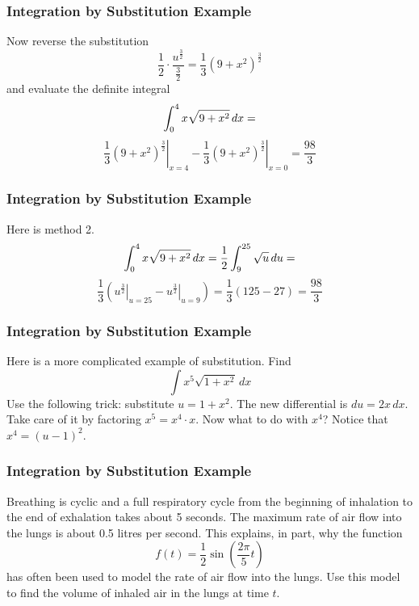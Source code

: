 \documentclass[xcolor=dvipsnames]{beamer}
\begin{document}
\begin{frame}
  \frametitle{Integration by Substitution Example}
Now reverse the substitution
\begin{equation}
  \label{eq:shaixeen}
\frac{1}{2}\cdot\frac{u^{\frac{3}{2}}}{\frac{3}{2}}=\frac{1}{3}(9+x^{2})^{\frac{3}{2}}
\end{equation}
and evaluate the definite integral
\begin{equation}
  \label{eq:eileevar}
\int_{0}^{4}x\sqrt{9+x^{2}}\,dx=\notag
\end{equation}
\begin{equation}
  \label{eq:lumuewah}
\left.\frac{1}{3}(9+x^{2})^{\frac{3}{2}}\right\vert_{x=4}-\left.\frac{1}{3}(9+x^{2})^{\frac{3}{2}}\right\vert_{x=0}=\frac{98}{3}
\end{equation}
\end{frame}

\begin{frame}
  \frametitle{Integration by Substitution Example}
Here is method 2.
\begin{equation}
  \label{eq:waethish}
  \int_{0}^{4}x\sqrt{9+x^{2}}\,dx=\frac{1}{2}\int_{9}^{25}\sqrt{u}\,du=\notag
\end{equation}
\begin{equation}
  \label{eq:anguyaeh}
  \frac{1}{3}\left(\left.u^{\frac{3}{2}}\right\vert_{u=25}-\left.u^{\frac{3}{2}}\right\vert_{u=9}\right)=\frac{1}{3}(125-27)=\frac{98}{3}
\end{equation}
\end{frame}

\begin{frame}
  \frametitle{Integration by Substitution Example}
   Here is a more complicated
  example of substitution. Find
  \begin{equation}
    \label{eq:jiucaing}
    \int{}x^{5}\sqrt{1+x^{2}}\,dx
  \end{equation}
  Use the following trick: substitute $u=1+x^{2}$. The new
  differential is $du=2x\,dx$. Take care of it by factoring
  $x^{5}=x^{4}\cdot{}x$. Now what to do with $x^{4}$? Notice that
  $x^{4}=(u-1)^{2}$.
\end{frame}

\begin{frame}
  \frametitle{Integration by Substitution Example}
  {\ubung} Breathing is cyclic and a full respiratory cycle from the beginning
  of inhalation to the end of exhalation takes about 5 seconds. The
  maximum rate of air flow into the lungs is about 0.5 litres per second. This
  explains, in part, why the function 
  \begin{equation}
    \label{eq:eisohmie}
    f(t)=\frac{1}{2}\sin\left(\frac{2\pi}{5}t\right)
  \end{equation}
  has often been used to model the rate of air flow into the lungs.
  Use this model to find the volume of inhaled air in the lungs at
  time $t$.
\end{frame}
\end{document}
